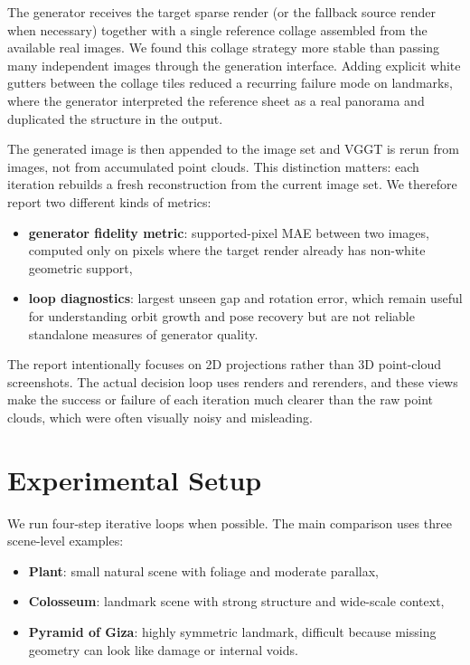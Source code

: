 \documentclass[11pt]{article}
\begin{document}
The generator receives the target sparse render (or the fallback source render when necessary) together with a single reference collage assembled from the available real images. We found this collage strategy more stable than passing many independent images through the generation interface. Adding explicit white gutters between the collage tiles reduced a recurring failure mode on landmarks, where the generator interpreted the reference sheet as a real panorama and duplicated the structure in the output.

The generated image is then appended to the image set and VGGT is rerun from images, not from accumulated point clouds. This distinction matters: each iteration rebuilds a fresh reconstruction from the current image set. We therefore report two different kinds of metrics:
\begin{itemize}
  \item \textbf{generator fidelity metric}: supported-pixel MAE between two images, computed only on pixels where the target render already has non-white geometric support,
  \item \textbf{loop diagnostics}: largest unseen gap and rotation error, which remain useful for understanding orbit growth and pose recovery but are not reliable standalone measures of generator quality.
\end{itemize}

The report intentionally focuses on 2D projections rather than 3D point-cloud screenshots. The actual decision loop uses renders and rerenders, and these views make the success or failure of each iteration much clearer than the raw point clouds, which were often visually noisy and misleading.

\section{Experimental Setup}
We run four-step iterative loops when possible. The main comparison uses three scene-level examples:
\begin{itemize}
  \item \textbf{Plant}: small natural scene with foliage and moderate parallax,
  \item \textbf{Colosseum}: landmark scene with strong structure and wide-scale context,
  \item \textbf{Pyramid of Giza}: highly symmetric landmark, difficult because missing geometry can look like damage or internal voids.
\end{itemize}
\end{document}
